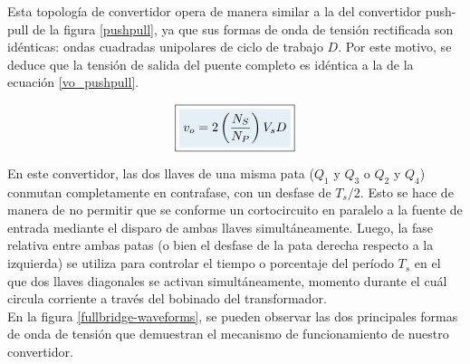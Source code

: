 Esta topología de convertidor opera de manera similar a la del convertidor push-pull de la figura \ref{pushpull}, ya que sus formas de onda de tensión rectificada son idénticas: ondas cuadradas unipolares de ciclo de trabajo $D$. Por este motivo, se deduce que la tensión de salida del puente completo es idéntica a la de la ecuación \ref{vo_pushpull}.

\begin{equation}\label{vo_fullbridge}
    \boxed{
        \highlight{v_o = 2\left(\frac{N_{S}}{N_{P}}\right)V_sD}
    }
\end{equation}

En este convertidor, las dos llaves de una misma pata ($Q_1$ y $Q_3$ o $Q_2$ y $Q_4$) conmutan completamente en contrafase, con un desfase de $T_s/2$. Esto se hace de manera de no permitir que se conforme un cortocircuito en paralelo a la fuente de entrada mediante el disparo de ambas llaves simultáneamente. Luego, la fase relativa entre ambas patas (o bien el desfase de la pata derecha respecto a la izquierda) se utiliza para controlar el tiempo o porcentaje del período $T_s$ en el que dos llaves diagonales se activan simultáneamente, momento durante el cuál circula corriente a través del bobinado del transformador.\\

En la figura \ref{fullbridge-waveforms}, se pueden observar las dos principales formas de onda de tensión que demuestran el mecanismo de funcionamiento de nuestro convertidor.\\

